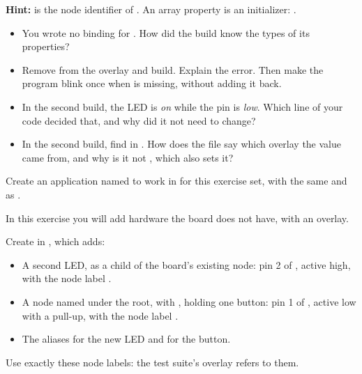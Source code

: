 \noindent \textbf{Hint:}  is the node identifier of .
An array property is an initializer: .

\begin{itemize}
  \item You wrote no binding for . How did the build know the types of its properties?
  \item Remove  from the overlay and build. Explain the error. Then make the program blink once
    when  is missing, without adding it back.
  \item In the second build, the LED is \emph{on} while the pin is \emph{low}. Which line of your code
    decided that, and why did it not need to change?
  \item In the second build, find  in . How does the file say
    which overlay the value came from, and why is it not , which also sets it?
\end{itemize}

\label{c2:set:2}
Create an application named  to work in for this exercise set, with the same
 and  as .

\label{c2:ex:2.1}
In this exercise you will add hardware the board does not have, with an overlay.

Create  in , which adds:

\begin{itemize}
  \item A second LED, as a child of the board’s existing  node: pin 2 of , active
    high, with the node label .
  \item A node named  under the root, with , holding one
    button: pin 1 of , active low with a pull-up, with the node label .
  \item The aliases  for the new LED and  for the button.
\end{itemize}

Use exactly these node labels: the test suite’s overlay refers to them.


